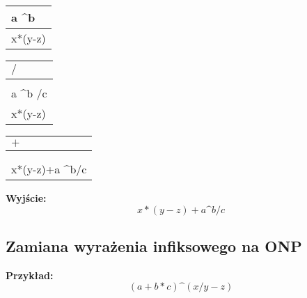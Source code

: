 \documentclass[main.tex]{subfiles}
\begin{document}
\begin{table}[H]
\begin{tabular}{|p{2cm}|}
            a \textasciicircum b \\
            \hline
            x*(y-z)\\
            \hline
        \end{tabular}
        \begin{tabular}{|p{2cm}|}
            \hline
            $\boldsymbol{/}$\\
            \hline
            \hline
            \\
            \hline
            a \textasciicircum b /c\\
            \hline
            x*(y-z)\\
            \hline
        \end{tabular}
    \end{table}
    \begin{table}[H]
        \begin{tabular}{|p{3cm}|}
            \hline
            $\boldsymbol{+}$\\
            \hline
            \hline
            \\
            \hline
            \\
            \hline
            x*(y-z)+a \textasciicircum b/c\\
            \hline
        \end{tabular}
    \end{table}
    \textbf{Wyjście:}
    \[x*(y-z)+a\text{\textasciicircum}b/c\]

    \subsection{Zamiana wyrażenia infiksowego na ONP}
    \textbf{Przykład:}
    \[(a+b*c)\text{\textasciicircum}(x/y - z)\]
\end{document}
